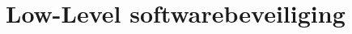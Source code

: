 \documentclass[../main.tex]{subfiles}
\begin{document}
\chapter{Low-Level softwarebeveiliging}
\end{document}
